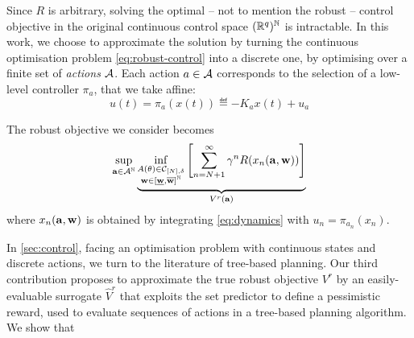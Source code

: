 \documentclass{article}
\newcommand{\todo}[1]{\textcolor{red}{#1}}
\begin{document}
Since $R$ is arbitrary, solving the optimal -- not to mention the robust -- control objective in the original continuous control space $(\mathbb{R}^q)^{\mathbb{N}}$ is intractable.
In this work, we choose to approximate the solution by turning the continuous optimisation problem \eqref{eq:robust-control} into a discrete one, by optimising over a finite set of \emph{actions} $\mathcal{A}$. Each action $a\in\mathcal{A}$ corresponds to the selection of a low-level controller $\pi_a$, that we take affine:
\[u(t) = \pi_a(x(t)) \eqdef -K_a x(t) + u_a\]

The robust objective we consider becomes 
\begin{equation}
\label{eq:robust-control-disc}
\sup_{\mathbf{a}\in{\mathcal{A}}^{\mathbb{N}}} \underbrace{\inf_{\substack{A(\theta) \in \mathcal{C}_{[N],\delta} \\ \mathbf{w}\in[\underline{\mathbf{w}},\overline{\mathbf{w}}]^{\mathbb{N}}}} \left[\sum_{n=N+1}^\infty \gamma^n R(x_n(\mathbf{a},\mathbf{w}))\right]}_{V^r(\mathbf{a})}
\end{equation}
where $x_n(\mathbf{a}, \mathbf{w})$ is obtained by integrating \eqref{eq:dynamics} with $u_n = \pi_{a_n}(x_n)$.

In \autoref{sec:control}, facing an optimisation problem with continuous states and discrete actions, we turn to the literature of tree-based planning. Our third contribution proposes to approximate the true robust objective ${V}^r$ by an easily-evaluable surrogate $\hat{V}^r$ that exploits the set predictor to define a pessimistic reward, used to evaluate sequences of actions in a tree-based planning algorithm. We show that 





\end{document}
